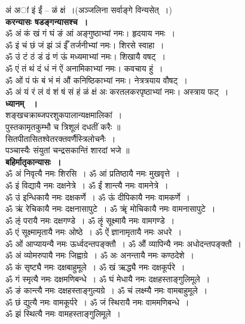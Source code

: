 \documentclass[twoside,top=1.7cm, bottom=1.7cm, outer=1cm,landscape, inner=1.5cm,a5paper,]{book}
\begin{document}
अं अां इं ईं -- ळं क्षं~।(अञ्जलिना सर्वाङ्गे विन्यसेत्~।)\\
{\bfseries करन्यासः षडङ्गन्यासश्च~।}\\ 
ॐ अं कं खं गं घं ङं आं  अङ्गुष्ठाभ्यां नमः। हृदयाय नमः~।\\
ॐ इं चं छं जं झं ञं ईँ     तर्जनीभ्यां नमः। शिरसे स्वाहा~।\\
ॐ उं टं ठं डं ढं णं ऊं    	मध्यमाभ्यां नमः। शिखायै वषट्‌~।\\
ॐ एं तं थं दं धं नं ऐं   	अनामिकाभ्यां नमः। कवचाय हुं~।\\
ॐ ओं पं फं बं भं मं औं 	कनिष्ठिकाभ्यां नमः। नेत्रत्रयाय वौषट्‌~।\\
ॐ अं यं रं लं वं शं षं सं हं ळं क्षं अः  करतलकरपृष्ठाभ्यां नमः। अस्त्राय फट्‌~।\\
{\bfseries ध्यानम् ~।}\\
शङ्खचक्राब्जपरशुकपालान्यक्षमालिकां~।\\
पुस्तकामृतकुम्भौ च त्रिशूलं दधतीं करैः ॥\\
सितपीतासितश्वेतरक्तवर्णैस्त्रिलोचनैः~।\\
पञ्चास्यैः संयुतां चन्द्रसकान्तिं शारदां भजे ॥\\[10pt]
{\bfseries बहिर्मातृकान्यासः~।}\\
ॐ अं निवृत्यै नमः शिरसि~।
ॐ आं प्रतिष्ठायै नमः मुखवृत्ते~।\\
ॐ इं विद्यायै नमः दक्षनेत्रे~।
ॐ ईं शान्त्यै नमः वामनेत्रे~।\\
ॐ उं इन्धिकायै नमः दक्षकर्णे~।
ॐ ऊं दीपिकायै नमः वामकर्णे~।\\
ॐ ऋं रेचिकायै नमः दक्षनासापुटे~।
ॐ ॠं मोचिकायै नमः वामनासापुटे~।\\
ॐ ऌं परायै नमः दक्षगण्डे~।
ॐ ऌृं सूक्ष्मायै नमः वामगण्डे~।\\
ॐ एं सूक्ष्मामृतायै नमः ओष्ठे~।
ॐ ऐं ज्ञानामृतायै नमः अधरे~।\\
ॐ ओं आप्यायन्यै नमः ऊर्ध्वदन्तपङ्क्तौ~।
ॐ औं व्यापिन्यै नमः अधोदन्तपङ्क्तौ~।\\
ॐ अं व्योमरुपायै नमः जिह्वाग्रे~।
ॐ अः अनन्तायै नमः कण्ठदेशे~।\\
ॐ कं सृष्ट्यै नमः दक्षबाहुमूले~।
ॐ खं ऋद्ध्यै नमः दक्षकूर्परे~।\\
ॐ गं स्मृत्यै नमः दक्षमणिबन्धे~।
ॐ घं मेधायै नमः दक्षहस्ताङ्गुलिमूले~।\\
ॐ ङं कान्त्यै नमः दक्षहस्ताङ्गुल्यग्रे~। 
ॐ चं लक्ष्म्यै नमः वामबाहुमूले~।\\
ॐ छं द्युत्यै नमः वामकूर्परे~।
ॐ जं स्थिरायै नमः वाममणिबन्धे~।\\
ॐ झं स्थित्यै नमः वामहस्ताङ्गुलिमूले~।
\end{document}
